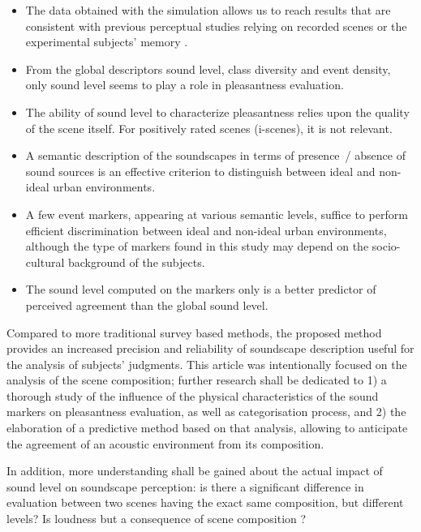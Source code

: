 \documentclass[twoside,twocolumn]{article}
\begin{document}
\begin{itemize}
\item The data obtained with the simulation allows us to reach results that are consistent with previous perceptual studies relying on recorded scenes \cite{lavandier2006contribution} or the experimental subjects' memory \cite{guastavino_ideal_2006}.
\item From the global descriptors sound level, class diversity and event density, only sound level seems to play a role in pleasantness evaluation.
\item The ability of sound level to characterize pleasantness relies upon the quality of the scene itself. For positively rated scenes (i-scenes), it is not relevant.
\item A semantic description of the soundscapes in terms of presence~/ absence of sound sources is an effective criterion to distinguish between ideal and non-ideal urban environments.
\item A few event markers, appearing at various semantic levels, suffice to perform efficient discrimination between ideal and non-ideal urban environments, although the type of markers found in this study may depend on the socio-cultural background of the subjects. 
\item The sound level computed on the markers only is a better predictor of perceived agreement than the global sound level.
\end{itemize}

Compared to more traditional survey based methods, the proposed method provides an increased precision and reliability of soundscape description useful for the analysis of subjects' judgments. This article was intentionally focused on the analysis of the scene composition; further research shall be dedicated to 1) a thorough study of the influence of the physical characteristics of the sound markers on pleasantness evaluation, as well as categorisation process, and 2) the elaboration of a predictive method based on that analysis, allowing to anticipate the agreement  of an acoustic environment from its composition.

In addition, more understanding shall be gained about the actual impact of sound level on soundscape perception: is there a significant difference in evaluation between two scenes having the exact same composition, but different levels? Is loudness but a consequence of scene composition ? 
\end{document}
